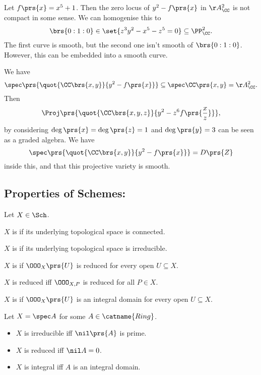 \documentclass[10pt,a4paper,twoside,openany,hidelinks]{book}
\begin{document}
\begin{example}
Let $f\prs{x} = x^5 + 1$. Then the zero locus of $y^2 - f\prs{x}$ in $\AA_\CC^2$ is not compact in some sense.
We can homogenise this to
$$\brs{0:1:0} \in \set{z^3 y^2 - x^5 - z^5 = 0} \subseteq \PP_\CC^2 \text{.}$$
The first curve is smooth, but the second one isn't smooth of $\brs{0:1:0}$.
However, this can be embedded into a smooth curve.

We have
$$\spec\prs{\quot{\CC\brs{x,y}}{y^2 - f\prs{x}}} \subseteq \spec \CC\prs{x,y} = \AA_\CC^2 \text{.}$$
Then
$$\Proj\prs{\quot{\CC\brs{x,y,z}}{y^2 - z^6 f\prs{\frac{x}{z}}}} \text{,}$$
by considering $\deg\prs{x} = \deg\prs{z} = 1$ and $\deg\prs{y} = 3$ can be seen as a graded algebra.
We have $$\spec\prs{\quot{\CC\brs{x,y}}{y^2 - f\prs{x}}} = D\prs{Z}$$ inside this, and that this projective variety is smooth.
\end{example}

\subsection{Properties of Schemes:}

Let $X \in \Sch$.

\begin{definition}
$X$ is  if its underlying topological space is connected.
\end{definition}

\begin{definition}
$X$ is  if its underlying topological space is irreducible.
\end{definition}

\begin{definition}
$X$ is  if $\OOO_X\prs{U}$ is reduced for every open $U \subseteq X$.
\end{definition}

\begin{exercise}
$X$ is reduced iff $\OOO_{X,P}$ is reduced for all $P \in X$.
\end{exercise}

\begin{definition}
$X$ is  if $\OOO_X\prs{U}$ is an integral domain for every open $U \subseteq X$.
\end{definition}

\begin{example}
Let $X = \spec A$ for some $A \in \catname{Ring}$.
\begin{itemize}
    \item $X$ is irreducible iff $\nil\prs{A}$ is prime.
    \item $X$ is reduced iff $\nil A = 0$.
    \item $X$ is integral iff $A$ is an integral domain.
\end{itemize}
\end{example}
\end{document}

